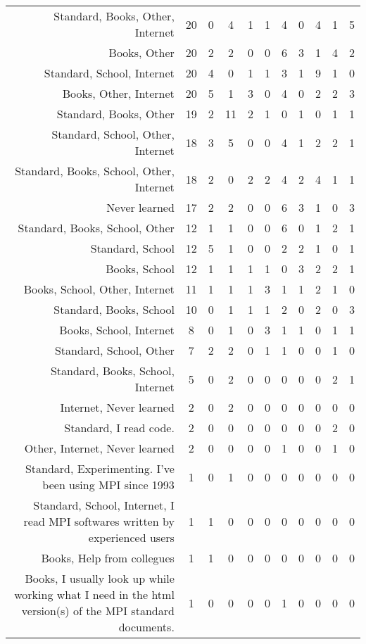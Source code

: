{\begin{landscape}
\begin{longtable}[htb]{r|c|c|c|c|c|c|c|c|c|c}
{Standard, Books, Other, Internet} & 20 & 0 & 4 & 1 & 1 & 4 & 0 & 4 & 1 & 5 \\%
{Books, Other} & 20 & 2 & 2 & 0 & 0 & 6 & 3 & 1 & 4 & 2 \\%
{Standard, School, Internet} & 20 & 4 & 0 & 1 & 1 & 3 & 1 & 9 & 1 & 0 \\%
{Books, Other, Internet} & 20 & 5 & 1 & 3 & 0 & 4 & 0 & 2 & 2 & 3 \\%
{Standard, Books, Other} & 19 & 2 & 11 & 2 & 1 & 0 & 1 & 0 & 1 & 1 \\%
{Standard, School, Other, Internet} & 18 & 3 & 5 & 0 & 0 & 4 & 1 & 2 & 2 & 1 \\%
{Standard, Books, School, Other, Internet} & 18 & 2 & 0 & 2 & 2 & 4 & 2 & 4 & 1 & 1 \\%
{Never learned} & 17 & 2 & 2 & 0 & 0 & 6 & 3 & 1 & 0 & 3 \\%
{Standard, Books, School, Other} & 12 & 1 & 1 & 0 & 0 & 6 & 0 & 1 & 2 & 1 \\%
{Standard, School} & 12 & 5 & 1 & 0 & 0 & 2 & 2 & 1 & 0 & 1 \\%
{Books, School} & 12 & 1 & 1 & 1 & 1 & 0 & 3 & 2 & 2 & 1 \\%
{Books, School, Other, Internet} & 11 & 1 & 1 & 1 & 3 & 1 & 1 & 2 & 1 & 0 \\%
{Standard, Books, School} & 10 & 0 & 1 & 1 & 1 & 2 & 0 & 2 & 0 & 3 \\%
{Books, School, Internet} & 8 & 0 & 1 & 0 & 3 & 1 & 1 & 0 & 1 & 1 \\%
{Standard, School, Other} & 7 & 2 & 2 & 0 & 1 & 1 & 0 & 0 & 1 & 0 \\%
{Standard, Books, School, Internet} & 5 & 0 & 2 & 0 & 0 & 0 & 0 & 0 & 2 & 1 \\%
{Internet, Never learned} & 2 & 0 & 2 & 0 & 0 & 0 & 0 & 0 & 0 & 0 \\%
{Standard, I read code.} & 2 & 0 & 0 & 0 & 0 & 0 & 0 & 0 & 2 & 0 \\%
{Other, Internet, Never learned} & 2 & 0 & 0 & 0 & 0 & 1 & 0 & 0 & 1 & 0 \\%
{Standard, Experimenting. I've been using MPI since 1993} & 1 & 0 & 1 & 0 & 0 & 0 & 0 & 0 & 0 & 0 \\%
{Standard, School, Internet, I read MPI softwares written by experienced users} & 1 & 1 & 0 & 0 & 0 & 0 & 0 & 0 & 0 & 0 \\%
{Books, Help from collegues} & 1 & 1 & 0 & 0 & 0 & 0 & 0 & 0 & 0 & 0 \\%
{Books, I usually look up while working what I need in the html version(s) of the MPI standard documents.} & 1 & 0 & 0 & 0 & 0 & 1 & 0 & 0 & 0 & 0 \\%

\end{longtable}
\end{landscape}}
